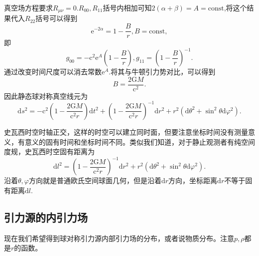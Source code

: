 \documentclass[11pt, a4paper, oneside, onecolumn]{ctexart}
\numberwithin{equation}{subsection}
\begin{document}
真空场方程要求$R_{\mu\nu}=0$.$R_{00},R_{11}$括号内相加可知$2\left(\alpha+\beta\right)=A=\text{const}$,将这个结果代入$R_{22}$括号可以得到
\begin{equation}
\mathrm{e}^{-2\alpha}=1-\frac{B}{r},B=\text{const},
\end{equation}
即
\begin{equation}
g_{00}=-\mathrm{c}^{2}\mathrm{e}^{A}\left(1-\frac{B}{r}\right),g_{11}=\left(1-\frac{B}{r}\right)^{-1}.
\end{equation}
通过改变时间尺度可以消去常数$\mathrm{e}^{A}$.将其与牛顿引力势对比，可以得到
\begin{equation}
B=\frac{2\mathrm{G}M}{\mathrm{c}^{2}}.
\end{equation}
因此静态球对称真空线元为
\begin{equation}
\mathrm{d}s^{2}=-\mathrm{c}^{2}\left(1-\frac{2\mathrm{G}M}{\mathrm{c}^{2}r}\right)\mathrm{d}t^{2}+\left(1-\frac{2\mathrm{G}M}{\mathrm{c}^{2}r}\right)^{-1}\mathrm{d}r^{2}+r^{2}\left(\mathrm{d}\theta^{2}+\sin^{2}\theta\mathrm{d}\varphi^{2}\right).
\end{equation}

史瓦西时空时轴正交，这样的时空可以建立同时面，但要注意坐标时间没有测量意义，有意义的固有时间和坐标时间不同。类似我们知道，对于静止观测者有纯空间度规，史瓦西时空固有距离为
\begin{equation}
\mathrm{d}l^{2}=\left(1-\frac{2\mathrm{G}M}{\mathrm{c}^{2}r}\right)^{-1}\mathrm{d}r^{2}+r^{2}\left(\mathrm{d}\theta^{2}+\sin^{2}\theta\mathrm{d}\varphi^{2}\right).
\end{equation}
沿着$\theta,\varphi$方向就是普通欧氏空间球面几何，但是沿着$\mathrm{d}r$方向，坐标距离$\mathrm{d}r$不等于固有距离$\mathrm{d}l$.

\subsection{引力源的内引力场}
现在我们希望得到球对称引力源内部引力场的分布，或者说物质分布。注意$p,\rho$都是$r$的函数。
\end{document}

